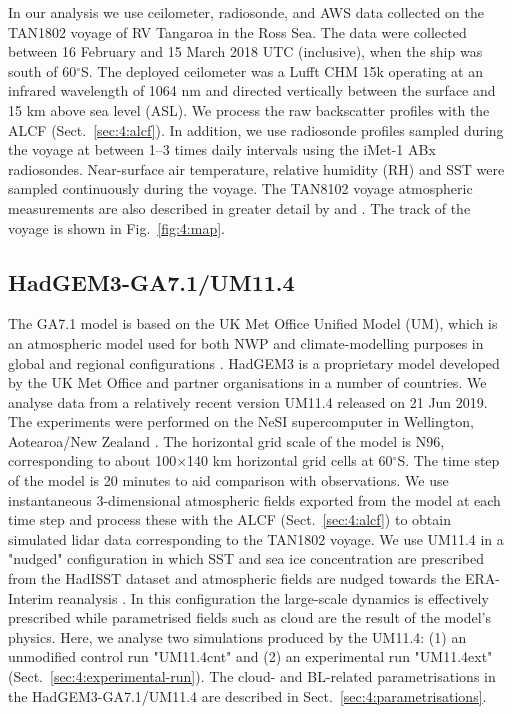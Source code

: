In our analysis we use ceilometer, radiosonde, and AWS data collected on the TAN1802 voyage
of RV Tangaroa in the Ross Sea. The data were collected
between 16 February and 15 March 2018 UTC (inclusive), when the ship was south of
60$^\circ$S. The deployed ceilometer was a Lufft CHM 15k operating at an
infrared wavelength of 1064 nm and directed vertically between the surface and 15 km above
sea level (ASL). We process the raw backscatter profiles with
the ALCF (Sect.~\ref{sec:4:alcf}). In addition, we use radiosonde profiles
sampled during the voyage at between 1--3 times daily intervals
using the iMet-1 ABx radiosondes. Near-surface air temperature, relative humidity (RH) and SST were sampled continuously during the voyage. The TAN8102
voyage atmospheric measurements are also described in greater detail by
\cite{kuma2020a} and \cite{hartery2020a}. The track of the voyage
is shown in Fig.~\ref{fig:4:map}.

\subsection{HadGEM3-GA7.1/UM11.4}

The GA7.1 model is based on the UK Met Office Unified Model (UM), which is an
atmospheric model used for both NWP and climate-modelling purposes in global and regional
configurations \citep{walters2019}. HadGEM3 is a proprietary model developed by the UK Met Office
and partner organisations in a number of countries. We analyse data from a relatively
recent version UM11.4 released on 21 Jun 2019. The experiments were performed on the NeSI
supercomputer in Wellington, Aotearoa/New Zealand \citep{williams2016}.
The horizontal grid scale of the model is N96,
corresponding to about 100$\times$140 km horizontal grid cells at
60$^\circ$S. The time step of the model is 20 minutes to aid comparison with observations.  %
We use instantaneous 3-dimensional atmospheric fields exported from the model at each time
step and process these with the ALCF (Sect.~\ref{sec:4:alcf}) to obtain simulated
lidar data corresponding to the TAN1802 voyage. We use UM11.4 in a "nudged"
configuration in which SST and sea ice concentration are prescribed from
the HadISST dataset \citep{rayner2003} and atmospheric fields are nudged towards the
ERA-Interim reanalysis \citep{dee2011}. In this configuration the large-scale
dynamics is effectively prescribed while parametrised fields
such as cloud are the result of the model's physics. Here, we analyse
two simulations produced by the UM11.4: (1) an unmodified control run "UM11.4cnt"
and (2) an experimental run "UM11.4ext" (Sect.~\ref{sec:4:experimental-run}).
The cloud- and BL-related parametrisations in the HadGEM3-GA7.1/UM11.4 are described in Sect.~\ref{sec:4:parametrisations}.

